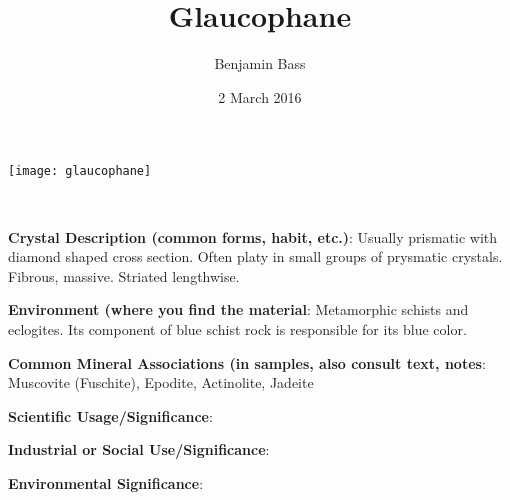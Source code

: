 \documentclass[10pt]{article}
\author{Benjamin Bass}
\date{2 March 2016}
\title{\vspace{-2.0cm}Glaucophane} %
\begin{document}
\maketitle


\begin{center}
  \texttt{[image: glaucophane]}
\end{center}



\
\
\
\
\
\
\
\
\
\

\begin{framed}
  \textbf{Crystal Description (common forms, habit, etc.)}: Usually prismatic with diamond shaped cross section. Often platy in small groups of prysmatic crystals. Fibrous, massive. Striated lengthwise.
\end{framed}

\begin{framed}
  \textbf{Environment (where you find the material}: Metamorphic schists and eclogites. Its component of blue schist rock is responsible for its blue color.
\end{framed}

\begin{framed}
  \textbf{Common Mineral Associations (in samples, also consult text, notes}: Muscovite (Fuschite), Epodite, Actinolite, Jadeite
\end{framed}

\begin{framed}
  \textbf{Scientific Usage/Significance}: 
\end{framed}

\begin{framed}
  \textbf{Industrial or Social Use/Significance}: 
\end{framed}

\begin{framed}
  \textbf{Environmental Significance}: 
\end{framed}

\end{document}
